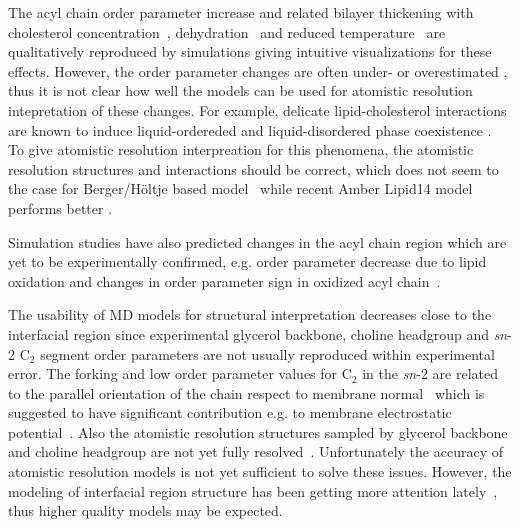\documentclass[aps,prl,superscriptaddress,twocolumn]{revtex4}
\begin{document}
The acyl chain order parameter increase and related bilayer thickening with cholesterol concentration~\cite{??,ferreira13,madej15},
dehydration~\cite{hogberg06,mashl01} and reduced temperature~\cite{zhuang14} are qualitatively reproduced 
by simulations giving intuitive visualizations for these effects. However, the order parameter
changes are often under- or overestimated \cite{hogberg06,lim12,zhuang14,ferreira13,madej15,??}, thus
it is not clear how well the models can be used for atomistic resolution intepretation of these changes.
For example, delicate lipid-cholesterol interactions are known to induce liquid-ordereded and liquid-disordered
phase coexistence \cite{ipsen87}. To give atomistic resolution interpreation for this phenomena, the atomistic
resolution structures and interactions should be correct, which does not seem to the case for Berger/H{\"o}ltje
based model~\cite{ferreira13} while recent Amber Lipid14 model performs better \cite{madej15}.

Simulation studies have also predicted changes in the acyl chain region which are yet to be experimentally 
confirmed, e.g. order parameter decrease due to lipid oxidation and changes in order parameter sign in oxidized 
acyl chain~\cite{ekkabut07}. %

The usability of MD models for structural interpretation decreases close to the interfacial region since
experimental glycerol backbone, choline headgroup and {\it sn}-2 C$_2$ segment order parameters are 
not usually reproduced within experimental error. The forking and low order parameter values for C$_2$ in the {\it sn}-2 are related
to the parallel orientation of the chain respect to membrane normal~\cite{schindler75,seelig75}
which is suggested to have significant contribution e.g. to membrane electrostatic potential~\cite{gawrisch92}.
Also the atomistic resolution structures sampled by glycerol backbone and choline headgroup are not yet fully 
resolved~\cite{gally75,seelig77,strenk85,akutsu91,bruzik97,Semchyschyn04}.
Unfortunately the accuracy of atomistic resolution models is not yet sufficient to solve these issues.
However, the modeling of interfacial region structure has been getting more attention lately~\cite{klauda10,prakash10,dickson12,chowdhary13,botan15}, 
thus higher quality models may be expected.  
\end{document}
